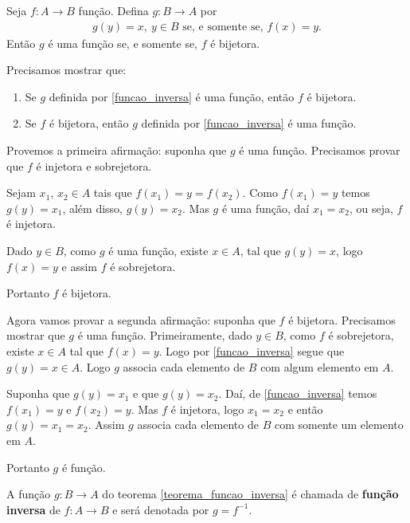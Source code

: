 \begin{teorema}\label{teorema_funcao_inversa}
    Seja $f: A \to B$ função. Defina $g : B \to A$ por
    \begin{align}\label{funcao_inversa}
        g(y) = x,\ y \in B \mbox{ se, e somente se, } f(x) = y.
    \end{align}
    Então $g$ é uma função se, e somente se, $f$ é bijetora.
\end{teorema}
\begin{prova}
    Precisamos mostrar que:
    \begin{enumerate}[label={\roman*})]
        \item Se $g$ definida por \eqref{funcao_inversa} é uma função, então $f$ é bijetora.
        \item Se $f$ é bijetora, então $g$ definida por \eqref{funcao_inversa} é uma função.
    \end{enumerate}

    Provemos a primeira afirmação: suponha que $g$ é uma função. Precisamos provar que $f$ é injetora e sobrejetora.

    Sejam $x_1$, $x_2 \in A$ tais que $f(x_1) = y = f(x_2)$. Como $f(x_1) = y$ temos $g(y) = x_1$, além disso, $g(y) = x_2$. Mas $g$ é uma função, daí $x_1 = x_2$, ou seja, $f$ é injetora.

    Dado $y \in B$, como $g$ é uma função, existe $x \in A$, tal que $g(y) = x$, logo $f(x) = y$ e assim $f$ é sobrejetora.

    Portanto $f$ é bijetora.

    Agora vamos provar a segunda afirmação: suponha que $f$ é bijetora. Precisamos mostrar que $g$ é uma função. Primeiramente, dado $y \in B$, como $f$ é sobrejetora, existe $x \in A$ tal que $f(x) = y$. Logo por \eqref{funcao_inversa} segue que $g(y) = x \in A$. Logo $g$ associa cada elemento de $B$ com algum elemento em $A$.

    Suponha que $g(y) = x_1$ e que $g(y) = x_2$. Daí, de \eqref{funcao_inversa} temos $f(x_1) = y$ e $f(x_2) = y$. Mas $f$ é injetora, logo $x_1 = x_2$ e então $g(y) = x_1 = x_2$. Assim $g$ associa cada elemento de $B$ com somente um elemento em $A$.

    Portanto $g$ é função.
\end{prova}


\begin{definicao}
    A função $g : B \to A$ do teorema \ref{teorema_funcao_inversa} é chamada de \textbf{função inversa} de $f : A \to B$ e será denotada por $g = f^{-1}$.
\end{definicao}


